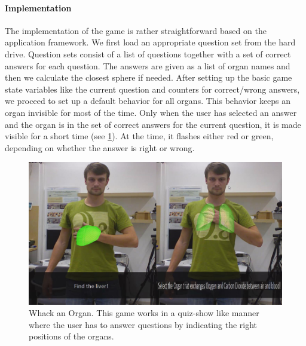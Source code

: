 \paragraph{Implementation}
The implementation of the game is rather straightforward based on the application framework. We first load an appropriate question set from the hard drive. Question sets consist of a list of questions together with a set of correct answers for each question. The answers are given as a list of organ names and then we calculate the closest sphere if needed.
After setting up the basic game state variables like the current question and counters for correct/wrong answers, we proceed to set up a default behavior for all organs. This behavior keeps an organ invisible for most of the time. Only when the user has selected an answer and the organ is in the set of correct answers for the current question, it is made visible for a short time (see \figurename{\ref{fig:3-IMR:organGaming}}). At the time, it flashes either red or green, depending on whether the answer is right or wrong.
\begin{figure}
	\centering
	\includegraphics[width=0.7\linewidth]{figures/3-IMR/organGaming}
	\caption{Whack an Organ. This game works in a quiz-show like manner where the user has to answer questions by indicating the right positions of the organs.}
	\label{fig:3-IMR:organGaming}
\end{figure}
